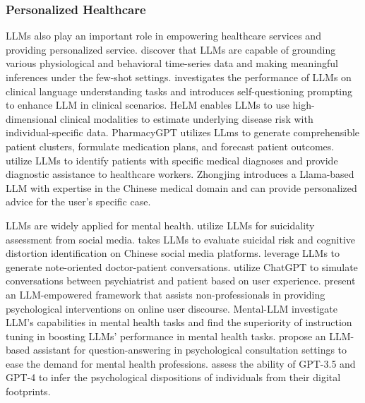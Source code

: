 \documentclass[11pt]{article}
\begin{document}
\subsubsection{Personalized Healthcare}
\label{sec:per_health}
LLMs also play an important role in empowering healthcare services and providing personalized service. \citet{liu2023large} discover that LLMs are capable of grounding various physiological and behavioral time-series data and making meaningful inferences under the few-shot settings. \citet{wang2023large} investigates the performance of LLMs on clinical language understanding tasks and introduces self-questioning prompting to enhance LLM in clinical scenarios. 
HeLM \cite{belyaeva2023multimodal} enables LLMs to use high-dimensional clinical modalities to estimate underlying disease risk with individual-specific data. 
PharmacyGPT \cite{liu2023pharmacygpt} utilizes LLms to generate comprehensible patient clusters, formulate medication plans, and forecast patient outcomes. \citet{zhang2023potential} utilize LLMs to identify patients with specific medical diagnoses and provide diagnostic assistance to healthcare workers. Zhongjing \cite{yang2023zhongjing} introduces a Llama-based LLM with expertise in the Chinese medical domain and can provide personalized advice for the user's specific case.


LLMs are widely applied for mental health. \citet{ghanadian2023chatgpt} utilize LLMs for suicidality assessment from social media. \citet{qi2023evaluating} takes LLMs to evaluate suicidal risk and cognitive distortion identification on Chinese social media platforms. \citet{wang2023umass_bionlp} leverage LLMs to generate note-oriented doctor-patient conversations. \citet{chen2023llm} utilize ChatGPT to simulate conversations between psychiatrist and patient based on user experience. \citet{fu2023enhancing} present an LLM-empowered framework that assists non-professionals in providing psychological interventions on online user discourse. Mental-LLM \cite{xu2023mental} investigate LLM's capabilities in mental health tasks and find the superiority of instruction tuning in boosting LLMs' performance in mental health tasks. \citet{lai2023psy} propose an LLM-based assistant for question-answering in psychological consultation settings to ease the demand for mental health professions. \citet{peters2023large} assess the ability of GPT-3.5 and GPT-4 to infer the psychological dispositions of individuals from their digital footprints.

\end{document}
